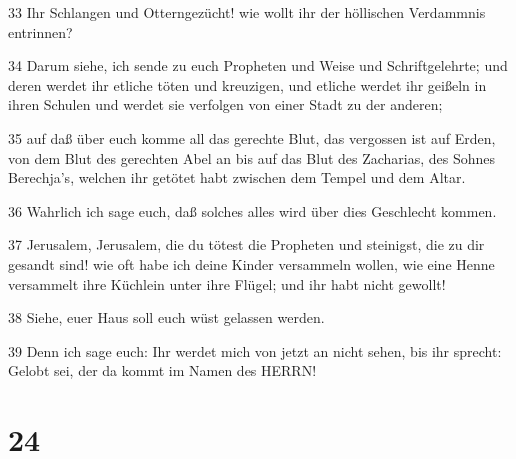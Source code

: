 \par 33 Ihr Schlangen und Otterngezücht! wie wollt ihr der höllischen Verdammnis entrinnen?
\par 34 Darum siehe, ich sende zu euch Propheten und Weise und Schriftgelehrte; und deren werdet ihr etliche töten und kreuzigen, und etliche werdet ihr geißeln in ihren Schulen und werdet sie verfolgen von einer Stadt zu der anderen;
\par 35 auf daß über euch komme all das gerechte Blut, das vergossen ist auf Erden, von dem Blut des gerechten Abel an bis auf das Blut des Zacharias, des Sohnes Berechja's, welchen ihr getötet habt zwischen dem Tempel und dem Altar.
\par 36 Wahrlich ich sage euch, daß solches alles wird über dies Geschlecht kommen.
\par 37 Jerusalem, Jerusalem, die du tötest die Propheten und steinigst, die zu dir gesandt sind! wie oft habe ich deine Kinder versammeln wollen, wie eine Henne versammelt ihre Küchlein unter ihre Flügel; und ihr habt nicht gewollt!
\par 38 Siehe, euer Haus soll euch wüst gelassen werden.
\par 39 Denn ich sage euch: Ihr werdet mich von jetzt an nicht sehen, bis ihr sprecht: Gelobt sei, der da kommt im Namen des HERRN!

\chapter{24}

